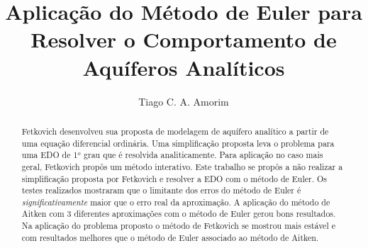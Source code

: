 \documentclass[final,5p]{elsarticle}
\numberwithin{equation}{section}
\begin{document}
\begin{frontmatter}



\title{Aplicação do Método de Euler para Resolver o Comportamento de Aquíferos Analíticos}


\author{Tiago C. A. Amorim}

\begin{abstract}

    Fetkovich desenvolveu sua proposta de modelagem de aquífero analítico a partir de uma equação diferencial ordinária. Uma simplificação proposta leva o problema para uma EDO de 1$^o$ grau que é resolvida analiticamente. Para aplicação no caso mais geral, Fetkovich propôs um método interativo.
    Este trabalho se propôs a não realizar a simplificação proposta por Fetkovich e resolver a EDO com o método de Euler. Os testes realizados mostraram que o limitante dos erros do método de Euler é \emph{significativamente} maior que o erro real da aproximação. A aplicação do método de Aitken com 3 diferentes aproximações com o método de Euler gerou bons resultados.
    Na aplicação do problema proposto o método de Fetkovich se mostrou mais estável e com resultados melhores que o método de Euler associado ao método de Aitken.


\end{abstract}
\end{frontmatter}
\end{document}
